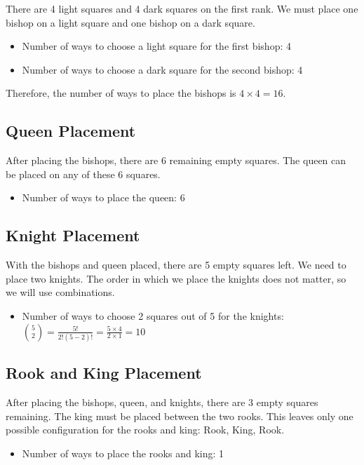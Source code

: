 \documentclass{article}
\begin{document}
There are 4 light squares and 4 dark squares on the first rank. We must place one bishop on a light square and one bishop on a dark square.

\begin{itemize}
    \item Number of ways to choose a light square for the first bishop: 4
    \item Number of ways to choose a dark square for the second bishop: 4
\end{itemize}

Therefore, the number of ways to place the bishops is $4 \times 4 = 16$.

\subsection{Queen Placement}

After placing the bishops, there are 6 remaining empty squares. The queen can be placed on any of these 6 squares.

\begin{itemize}
    \item Number of ways to place the queen: 6
\end{itemize}

\subsection{Knight Placement}

With the bishops and queen placed, there are 5 empty squares left. We need to place two knights. The order in which we place the knights does not matter, so we will use combinations.

\begin{itemize}
    \item Number of ways to choose 2 squares out of 5 for the knights: $\binom{5}{2} = \frac{5!}{2!(5-2)!} = \frac{5 \times 4}{2 \times 1} = 10$
\end{itemize}

\subsection{Rook and King Placement}

After placing the bishops, queen, and knights, there are 3 empty squares remaining. The king must be placed between the two rooks. This leaves only one possible configuration for the rooks and king: Rook, King, Rook.

\begin{itemize}
    \item Number of ways to place the rooks and king: 1
\end{itemize}
\end{document}
